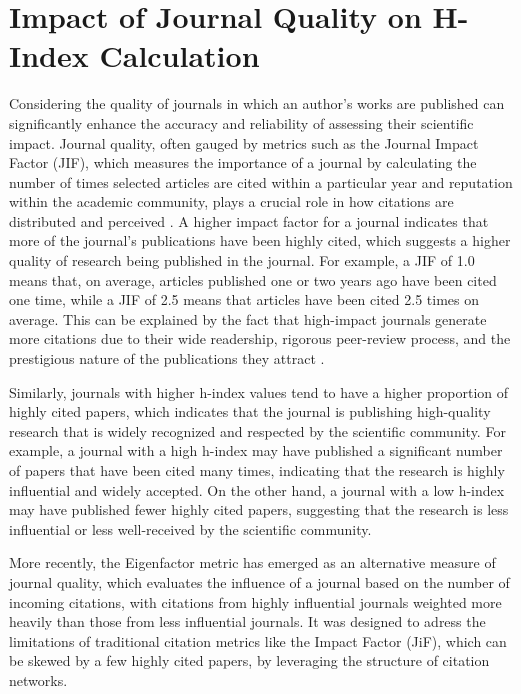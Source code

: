 \section{Impact of Journal Quality on H-Index Calculation}
Considering the quality of journals in which an author's works are published
can significantly enhance the accuracy and reliability of assessing their
scientific impact. Journal quality, often gauged by metrics such as the Journal
Impact Factor (JIF), which measures the importance of a journal by calculating
the number of times selected articles are cited within a particular year and
reputation within the academic community, plays a crucial role in how citations
are distributed and perceived \cite{garfield1999journal, garfield2006history}.
A higher impact factor for a journal indicates that more of the journal's
publications have been highly cited, which suggests a higher quality of
research being published in the journal. For example, a JIF of 1.0 means that,
on average, articles published one or two years ago have been cited one time,
while a JIF of 2.5 means that articles have been cited 2.5 times on average.
This can be explained by the fact that high-impact journals generate more
citations due to their wide readership, rigorous peer-review process, and the
prestigious nature of the publications they attract \cite{garfield2006history}.

Similarly, journals with higher h-index values tend to have a higher proportion
of highly cited papers, which indicates that the journal is publishing
high-quality research that is widely recognized and respected by the scientific
community. For example, a journal with a high h-index may have published a
significant number of papers that have been cited many times, indicating that
the research is highly influential and widely accepted. On the other hand, a
journal with a low h-index may have published fewer highly cited papers,
suggesting that the research is less influential or less well-received by the
scientific community.

More recently, the Eigenfactor metric has emerged as an alternative measure of
journal quality, which evaluates the influence of a journal based on the number
of incoming citations, with citations from highly influential journals weighted
more heavily than those from less influential journals. It was designed to
adress the limitations of traditional citation metrics like the Impact Factor
(JiF), which can be skewed by a few highly cited papers, by leveraging the
structure of citation networks.


